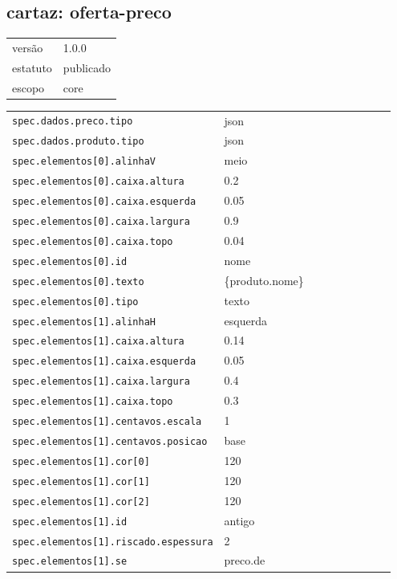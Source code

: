 \subsection*{cartaz: oferta-preco}
\begin{tabular}{@{}ll@{}}
versão & 1.0.0 \\
estatuto & publicado \\
escopo & core \\
\end{tabular}

\begin{tabular}{@{}p{0.35\linewidth}p{0.6\linewidth}@{}}
\texttt{spec.dados.preco.tipo} & json \\
\texttt{spec.dados.produto.tipo} & json \\
\texttt{spec.elementos[0].alinhaV} & meio \\
\texttt{spec.elementos[0].caixa.altura} & 0.2 \\
\texttt{spec.elementos[0].caixa.esquerda} & 0.05 \\
\texttt{spec.elementos[0].caixa.largura} & 0.9 \\
\texttt{spec.elementos[0].caixa.topo} & 0.04 \\
\texttt{spec.elementos[0].id} & nome \\
\texttt{spec.elementos[0].texto} & \{produto.nome\} \\
\texttt{spec.elementos[0].tipo} & texto \\
\texttt{spec.elementos[1].alinhaH} & esquerda \\
\texttt{spec.elementos[1].caixa.altura} & 0.14 \\
\texttt{spec.elementos[1].caixa.esquerda} & 0.05 \\
\texttt{spec.elementos[1].caixa.largura} & 0.4 \\
\texttt{spec.elementos[1].caixa.topo} & 0.3 \\
\texttt{spec.elementos[1].centavos.escala} & 1 \\
\texttt{spec.elementos[1].centavos.posicao} & base \\
\texttt{spec.elementos[1].cor[0]} & 120 \\
\texttt{spec.elementos[1].cor[1]} & 120 \\
\texttt{spec.elementos[1].cor[2]} & 120 \\
\texttt{spec.elementos[1].id} & antigo \\
\texttt{spec.elementos[1].riscado.espessura} & 2 \\
\texttt{spec.elementos[1].se} & preco.de \\

\end{tabular}
